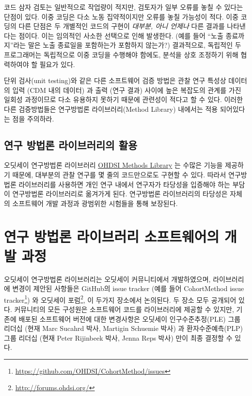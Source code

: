 \documentclass[10.5pt]{book}
\let\rmarkdownfootnote\footnote%
\def\footnote{\protect\rmarkdownfootnote}
\theoremstyle{definition}
\theoremstyle{definition}
\theoremstyle{definition}
\theoremstyle{remark}
\begin{document}
코드 삼자 검토는 일반적으로 작업량이 적지만, 검토자가 일부 오류를 놓칠
수 있다는 단점이 있다. 이중 코딩은 다소 노동 집약적이지만 오류를 놓칠
가능성이 적다. 이중 코딩의 다른 단점은 두 개별적인 코드의 구현이
\emph{대부분, 아니 언제나} 다른 결과를 나타낸다는 점이다. 이는 임의적인
사소한 선택으로 인해 발생한다. (예를 들어 ``노출 종료까지''라는 말은
노출 종료일을 포함하는가 포함하지 않는가?) 결과적으로, 독립적인 두
프로그래머는 독립적으로 이중 코딩을 수행해야 함에도, 분석을 상호
조정하기 위해 협력하여야 할 필요가 있다.

단위 검사(unit testing)와 같은 다른 소프트웨어 검증 방법은 관찰 연구
특성상 데이터의 입력 (CDM 내의 데이터) 과 출력 (연구 결과) 사이에 높은
복잡도의 관계를 가진 일회성 과정이므로 다소 유용하지 못하기 때문에
관련성이 적다고 할 수 있다. 이러한 다른 검증방법들은 연구방법론
라이브러리(Method Library) 내에서는 적용 되어있다는 점을 주의하라.

\subsection{연구 방법론 라이브러리의 활용}\label{---}

오딧세이 연구방법론 라이브러리
\href{https://ohdsi.github.io/MethodsLibrary/}{OHDSI Methods Library} 는
수많은 기능을 제공하기 때문에, 대부분의 관찰 연구를 몇 줄의 코드만으로도
구현할 수 있다. 따라서 연구방법론 라이브러리를 사용하면 개인 연구 내에서
연구자가 타당성을 입증해야 하는 부담이 연구방법론 라이브러리로 옮겨가게
된다. 연구방법론 라이브러리의 타당성은 자체의 소프트웨어 개발 과정과
광범위한 시험들을 통해 보장된다.

\section{연구 방법론 라이브러리 소프트웨어의 개발 과정}\label{-----}

오딧세이 연구방법론 라이브러리는 오딧세이 커뮤니티에서 개발하였으며,
라이브러리에 변경이 제안된 사항들은 GitHub의 issue tracker (예를 들어
CohortMethod issue tracker\footnote{\url{https://github.com/OHDSI/CohortMethod/issues}})
와 오딧세이 포럼\footnote{\url{http://forums.ohdsi.org/}}, 이 두가지
장소에서 논의된다. 두 장소 모두 공개되어 있다. 커뮤니티의 모든 구성원은
소프트웨어 코드를 라이브러리에 제공할 수 있지만, 기존에 배포된
소프트웨어 버전에 대한 변경사항은 오딧세이 인구수준추정(PLE) 그룹 리더십
(현재 Marc Sucahrd 박사, Martigin Schuemie 박사) 과 환자수준예측(PLP)
그룹 리더십 (현재 Peter Rijinbeek 박사, Jenna Reps 박사) 만이 최종
결정할 수 있다.
\end{document}
